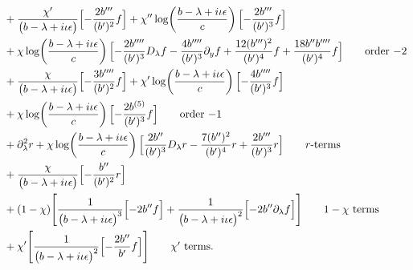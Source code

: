 \documentclass[reqno,11pt]{amsart}
\numberwithin{equation}{section}
\newcommand{\p}{\partial}
\newcommand{\D}{D_\lambda}
\numberwithin{equation}{section} %
\begin{document}
\begin{enumerate}
\begin{align}
&+\frac{\chi'}{\bigl(b -\lambda+i\iota\epsilon\bigr)}\Bigl[- \frac{2 b''' }{(b' )^{2}} f\Bigr]+\chi''\log\!\left(\frac{b -\lambda+i\iota\epsilon}{c}\right)\Bigl[- \frac{2 b''' }{(b' )^{3}} f\Bigr]\notag\\
&+\chi\log\!\left(\frac{b -\lambda+i\iota\epsilon}{c}\right)\Bigl[- \frac{2 b'''' }{(b' )^{3}} \D f- \frac{4 b'''' }{(b' )^{3}} \p_y f+\frac{12 (b''' )^{2}}{(b' )^{4}} f+\frac{18 b''  b'''' }{(b' )^{4}} f\Bigr]\tag*{\text{order $-2$}}\\
&+\frac{\chi}{\bigl(b -\lambda+i\iota\epsilon\bigr)}\Bigl[- \frac{3 b'''' }{(b' )^{2}} f\Bigr]+\chi'\log\!\left(\frac{b -\lambda+i\iota\epsilon}{c}\right)\Bigl[- \frac{4 b'''' }{(b' )^{3}} f\Bigr]\notag\\
&+\chi\log\!\left(\frac{b -\lambda+i\iota\epsilon}{c}\right)\Bigl[- \frac{2 b^{(5)} }{(b' )^{3}} f\Bigr]\tag*{\text{order $-1$}}\\
&+\p_\lambda^2 r+\chi\log\!\left(\frac{b -\lambda+i\iota\epsilon}{c}\right)\Bigl[\frac{2 b'' }{(b' )^{3}} \D r- \frac{7 (b'' )^{2}}{(b' )^{4}} r+\frac{2 b''' }{(b' )^{3}} r\Bigr]\tag*{\text{$r$-terms}}\\
&+\frac{\chi}{\bigl(b -\lambda+i\iota\epsilon\bigr)}\Bigl[- \frac{b'' }{(b' )^{2}} r\Bigr]\notag\\
&+(1-\chi)\Bigg[\frac{1}{\bigl(b -\lambda+i\iota\epsilon\bigr)^{3}}\Bigl[- 2 b''  f\Bigr]+\frac{1}{\bigl(b -\lambda+i\iota\epsilon\bigr)^{2}}\Bigl[- 2 b''  \p_\lambda f\Bigr]\Bigg]\tag*{\text{$1-\chi$ terms}}\\
&+\chi'\Bigg[\frac{1}{\bigl(b -\lambda+i\iota\epsilon\bigr)^{2}}\Bigl[- \frac{2 b'' }{b' } f\Bigr]\Bigg]\tag*{\text{$\chi'$ terms}}.\\
&
\end{align}


\end{enumerate}
\end{document}
